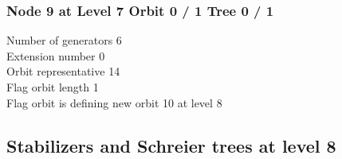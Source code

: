 \subsubsection*{Node 9 at Level 7 Orbit 0 / 1 Tree 0 / 1}
Number of generators 6\\

\noindent Extension number 0\\
Orbit representative 14\\
Flag orbit length 1\\
Flag orbit is defining new orbit 10 at level 8\\

\subsection{Stabilizers and Schreier trees at level 8}

